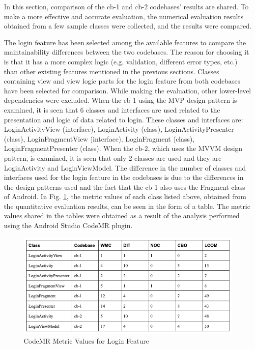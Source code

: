 In this section, comparison of the cb-1 and cb-2 codebases' results are shared. To make a more effective and accurate evaluation, the numerical evaluation results obtained from a few sample classes were collected, and the results were compared. 

The login feature has been selected among the available features to compare the maintainability differences between the two codebases. The reason for choosing it is that it has a more complex logic (e.g. validation, different error types, etc.) than other existing features mentioned in the previous sections. Classes containing view and view logic parts for the login feature from both codebases have been selected for comparison. While making the evaluation, other lower-level dependencies were excluded. When the cb-1 using the MVP design pattern is examined, it is seen that 6 classes and interfaces are used related to the presentation and logic of data related to login. These classes and interfaces are: LoginActivityView (interface), LoginActivity (class), LoginActivityPresenter (class), LoginFragmentView (interface), LoginFragment (class), LoginFragmentPresenter (class). When the cb-2, which uses the MVVM design pattern, is examined, it is seen that only 2 classes are used and they are LoginActivity and LoginViewModel. The difference in the number of classes and interfaces used for the login feature in the codebases is due to the differences in the design patterns used and the fact that the cb-1 also uses the Fragment class of Android. In Fig. \ref{fig:login-metric-table}, the metric values of each class listed above, obtained from the quantitative evaluation results, can be seen in the form of a table. The metric values shared in the tables were obtained as a result of the analysis performed using the Android Studio CodeMR plugin.
\begin{figure}[ht!]
    \centering
    \includegraphics[scale=0.65]{figures/login-metric-table.png}
    \caption{CodeMR Metric Values for Login Feature}
    \label{fig:login-metric-table}
\end{figure}
\FloatBarrier

